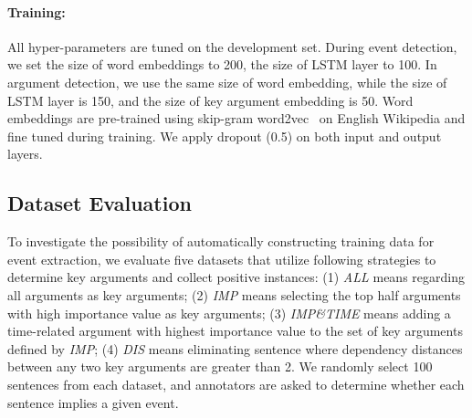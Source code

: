 \paragraph{Training:} All hyper-parameters are tuned on the development set. During event detection, we set the size of word embeddings to 200, the size of LSTM layer to 100. In argument detection, we use the same size of word embedding, while the size of LSTM layer is 150, and the size of key argument embedding is 50. Word embeddings are pre-trained using skip-gram word2vec~\cite{mikolov2013distributed} on English Wikipedia and fine tuned during training. We apply dropout (0.5) on both input and output layers.

\subsection{Dataset Evaluation}\label{sec:evalhypo}
To investigate the possibility of automatically constructing training data for event extraction, we evaluate five datasets that utilize  following strategies to determine key arguments and collect positive instances: (1) \emph{ALL} means regarding all arguments as key arguments; (2) \emph{IMP} means selecting the top half arguments with high importance value as key arguments; (3) \emph{IMP\&TIME} means adding a time-related argument with highest importance value to the set of key arguments defined by \emph{IMP}; (4) \emph{DIS} means eliminating sentence where dependency distances between any two key arguments are greater than 2. We randomly select 100 sentences from each dataset, and annotators are asked to determine whether each sentence implies a given event.


